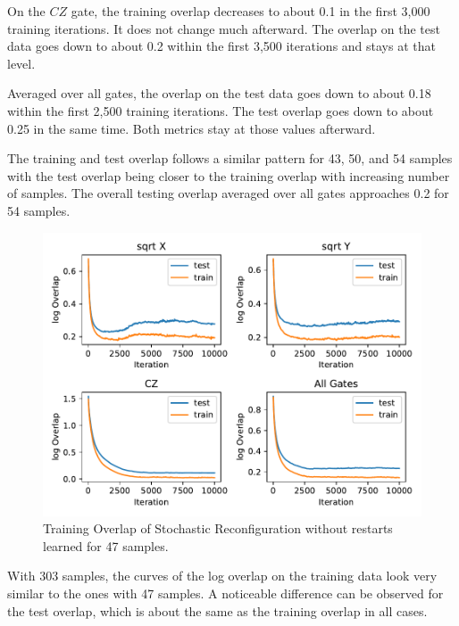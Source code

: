 On the $CZ$ gate, the training overlap decreases to about 0.1 in the first 3,000 training iterations. It does 
not change much afterward. The overlap on the test data goes down to about 0.2 within the first 3,500 iterations 
and stays at that level.

Averaged over all gates, the overlap on the test data goes down to about 0.18 within the first 2,500 training iterations. 
The test overlap goes down to about 0.25 in the same time. Both metrics stay at those values afterward.

The training and test overlap follows a similar pattern for 43, 50, and 54 samples with the 
test overlap being closer to the training overlap with increasing number of samples. The overall
testing overlap averaged over all gates approaches 0.2 for 54 samples.

\begin{figure}[H]
  \centering
  \includegraphics[width=\textwidth]{figures/results/SR-no-restarts-learned/avgOverlap_47.pdf}
  \caption[Training and Testing Overlaps for Stochastic Reconfiguration without Random Restarts and $CZ$ Gates Learned - 47 Samples]{Training 
  Overlap of Stochastic Reconfiguration without restarts learned for 47 samples.}
  \label{fig:sr_no_restarts_overlap_47}
\end{figure}

With 303 samples, the curves of the log overlap on the training data look very similar to the 
ones with 47 samples. A noticeable difference can be observed for the test overlap, which is 
about the same as the training overlap in all cases.


